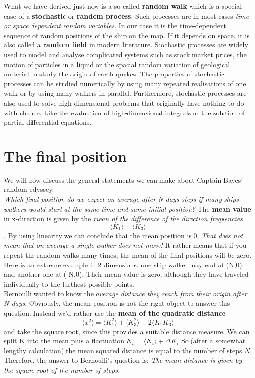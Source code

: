 \documentclass[12pt, a4paper]{scrartcl}
\begin{document}
What we have derived just now is a so-called \textbf{random walk} which is a special case of a \textbf{stochastic} or \textbf{random process}. Such processes are in most cases \textit{time or space dependent random variables}. In our case it is the time-dependent sequence of random positions of the ship on the map. If it depends on space, it is also called a \textbf{random field} in modern literature.
Stochastic processes are widely used to model and analyse complicated systems such as stock market prices, the motion of particles in a liquid or the spacial random variation of geological material to study the origin of earth quakes.
The properties of stochastic processes can be studied numerically by using many repeated realisations of one walk or by using many walkers in parallel.
Furthermore, stochastic processes are also used to solve high dimensional problems that originally have nothing to do with chance.  Like the evaluation of high-dimensional integrals or the solution of partial differential equations.\\

\section*{The final position}
We will now discuss the general statements we can make about Captain Bayes' random odyssey.\\
\textit{Which final position do we expect on average after N days steps if many ships walkers would start at the same time and same initial position?}
The \textbf{mean value} in x-direction is given by the \textit{mean of the difference of the direction frequencies} \[\langle K_1\rangle-\langle K_3\rangle\]. By using linearity we can conclude that the mean position is 0. 
\textit{That does not mean that on average a single walker does not move!}
It rather means that if you repeat the random walks many times, the mean of the final positions will be zero. 
Here is an extreme example in 2 dimensions: one ship walker may end at (N,0) and another one at (-N,0). Their mean value is zero, although they have traveled individually to the furthest possible points.\\
Bernoulli wanted to know the \textit{average distance they reach from their origin after N days}. Obviously, the mean position is not the right object to answer this question. Instead we’d rather use the \textbf{mean of the quadratic distance} \[\langle x^2\rangle = \langle K_1^2\rangle + \langle K_3^2\rangle-2\langle K_1K_3\rangle\] and take the square root, since this provides a suitable distance measure.
We can split K into the mean plus a fluctuation $K_i=\langle K_i\rangle +\Delta K_i$
So (after a somewhat lengthy calculation) the mean squared distance is equal to the number of steps $N$.
Therefore, the answer to Bernoulli's question is: 
\textit{The mean distance is given by the square root of the number of steps.}\\
\end{document}
